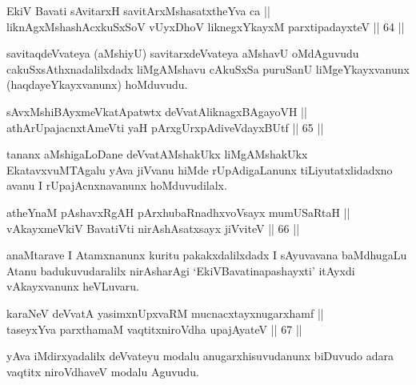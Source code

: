 \begin{shl}
EkiV Bavati sAvitarxH savitArxM\s shasatxtheYva ca || \\
liknAgxMshashAcxkuSxSoV vUyxDhoV liknegxYkayxM parxtipadayxteV \hfill || 64 ||  
\end{shl}

\begin{artha}
savitaqdeVvateya (aMshiyU) savitarxdeVvateya aMshavU oMdAguvudu
cakuSxsAthxnadalilxdadx liMgAMshavu cAkuSxSa puruSanU liMgeYkayxvanunx
(haqdayeYkayxvanunx) hoMduvudu.
\end{artha}


\begin{shl}
sAvxMshiBAyxmeVkatApatwtx deVvatAliknagxBAgayoVH || \\
athArUpajacnxtAmeVti yaH pArxgUrxpAdiveVdayxBUtf \hfill || 65 ||  
\end{shl}

\begin{artha}
tananx aMshigaLoDane deVvatAMshakUkx liMgAMshakUkx EkatavxvuMTAgalu
yAva jiVvanu hiMde rUpAdigaLanunx tiLiyutatxlidadxno avanu I
rUpajAcnxnavanunx hoMduvudilalx.
\end{artha}


\begin{shl}
atheYnaM pAshavxRgAH pArxhubaRnadhxvoV\s sayx mumUSaRtaH || \\
vAkayxmeVkiV BavatiVti nirAshAsatxsayx jiVviteV \hfill || 66 ||  
\end{shl}

\begin{artha}
anaMtarave I Atamxnanunx kuritu pakakxdalilxdadx I sAyuvavana
baMdhugaLu Atanu badukuvudaralilx nirAsharAgi `EkiVBavatinapashayxti'
itAyxdi vAkayxvanunx heVLuvaru.
\end{artha}


\begin{shl}
karaNeV deVvatA yasimxnUpxvaRM mucnacxtayxnugarxhamf || \\
taseyxYva parxthamaM vaqtitxniroVdha upajAyateV \hfill || 67 ||  
\end{shl}

\begin{artha}
yAva iMdirxyadalilx deVvateyu modalu anugarxhisuvudanunx biDuvudo
adara vaqtitx niroVdhaveV modalu Aguvudu.
\end{artha}

